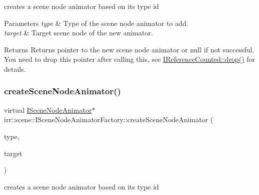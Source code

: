 creates a scene node animator based on its type id 


\begin{DoxyParams}{Parameters}
{\em type} & Type of the scene node animator to add. \\
\hline
{\em target} & Target scene node of the new animator. \\
\hline
\end{DoxyParams}
\begin{DoxyReturn}{Returns}
Returns pointer to the new scene node animator or null if not successful. You need to drop this pointer after calling this, see \hyperlink{classirr_1_1IReferenceCounted_a03856a09355b89d178090c4a5f738543}{I\+Reference\+Counted\+::drop()} for details. 
\end{DoxyReturn}
\mbox{\label{classirr_1_1scene_1_1ISceneNodeAnimatorFactory_a509845a16fa1fdd7241bb10416327eb2}} 
\subsubsection{\texorpdfstring{create\+Scene\+Node\+Animator()}{createSceneNodeAnimator()}\hspace{0.1cm}{\footnotesize\ttfamily [2/4]}}
{\footnotesize\ttfamily virtual \hyperlink{classirr_1_1scene_1_1ISceneNodeAnimator}{I\+Scene\+Node\+Animator}$\ast$ irr\+::scene\+::\+I\+Scene\+Node\+Animator\+Factory\+::create\+Scene\+Node\+Animator (\begin{DoxyParamCaption}\item[{\hyperlink{namespaceirr_1_1scene_a327a1e43872705cf8f3f3342fb307d19}{E\+S\+C\+E\+N\+E\+\_\+\+N\+O\+D\+E\+\_\+\+A\+N\+I\+M\+A\+T\+O\+R\+\_\+\+T\+Y\+PE}}]{type,  }\item[{\hyperlink{classirr_1_1scene_1_1ISceneNode}{I\+Scene\+Node} $\ast$}]{target }\end{DoxyParamCaption})\hspace{0.3cm}{\ttfamily [pure virtual]}}



creates a scene node animator based on its type id 


